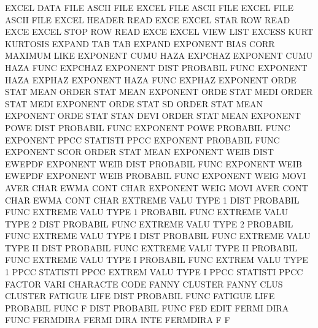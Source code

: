EXCEL    DATA FILE                      ASCII    FILE
EXCEL    FILE                           ASCII    FILE
EXCEL    FILE                           ASCII    FILE
EXCEL    HEADER                         READ     EXCE
EXCEL    STAR ROW                       READ     EXCE
EXCEL    STOP ROW                       READ     EXCE
EXCEL    VIEW                           LIST
EXCESS   KURT                           KURTOSIS
EXPAND   TAB                            TAB      EXPAND
EXPONENT BIAS CORR                      MAXIMUM  LIKE
EXPONENT CUMU HAZA                      EXPCHAZ
EXPONENT CUMU HAZA FUNC                 EXPCHAZ
EXPONENT DIST                           PROBABIL FUNC
EXPONENT HAZA                           EXPHAZ
EXPONENT HAZA FUNC                      EXPHAZ
EXPONENT ORDE STAT MEAN                 ORDER    STAT MEAN
EXPONENT ORDE STAT MEDI                 ORDER    STAT MEDI
EXPONENT ORDE STAT SD                   ORDER    STAT MEAN
EXPONENT ORDE STAT STAN DEVI            ORDER    STAT MEAN
EXPONENT POWE DIST                      PROBABIL FUNC
EXPONENT POWE                           PROBABIL FUNC
EXPONENT PPCC                           STATISTI PPCC
EXPONENT                                PROBABIL FUNC
EXPONENT SCOR                           ORDER    STAT MEAN
EXPONENT WEIB DIST                      EWEPDF
EXPONENT WEIB DIST                      PROBABIL FUNC
EXPONENT WEIB                           EWEPDF
EXPONENT WEIB                           PROBABIL FUNC
EXPONENT WEIG MOVI AVER CHAR            EWMA     CONT CHAR
EXPONENT WEIG MOVI AVER CONT CHAR       EWMA     CONT CHAR
EXTREME  VALU TYPE 1    DIST            PROBABIL FUNC
EXTREME  VALU TYPE 1                    PROBABIL FUNC
EXTREME  VALU TYPE 2    DIST            PROBABIL FUNC
EXTREME  VALU TYPE 2                    PROBABIL FUNC
EXTREME  VALU TYPE I    DIST            PROBABIL FUNC
EXTREME  VALU TYPE II   DIST            PROBABIL FUNC
EXTREME  VALU TYPE II                   PROBABIL FUNC
EXTREME  VALU TYPE I                    PROBABIL FUNC
EXTREM   VALU TYPE 1    PPCC            STATISTI PPCC
EXTREM   VALU TYPE I    PPCC            STATISTI PPCC
FACTOR   VARI                           CHARACTE CODE
FANNY                                   CLUSTER
FANNY    CLUS                           CLUSTER
FATIGUE  LIFE DIST                      PROBABIL FUNC
FATIGUE  LIFE                           PROBABIL FUNC
F        DIST                           PROBABIL FUNC
FED                                     EDIT
FERMI    DIRA FUNC                      FERMDIRA
FERMI    DIRA INTE                      FERMDIRA
F                                       F
